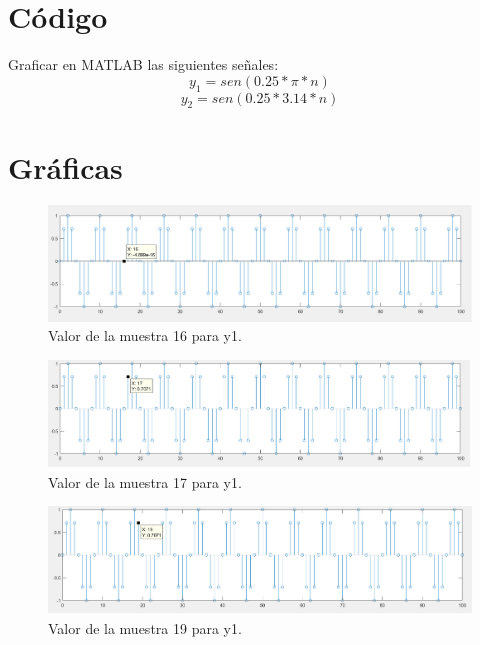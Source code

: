 \documentclass[12pt]{article}
\begin{document}

\newpage
\section{Código}
Graficar en MATLAB las siguientes señales:
$$y_{1}=sen(0.25*\pi*n)$$
$$y_{2}=sen(0.25*3.14*n)$$


\section{Gráficas}

\begin{figure}[h]
    \centering
        \includegraphics[width=15cm]{IMAGENES/T1_val1.png}
        \caption{Valor de la muestra 16 para y1.}
\end{figure}

\begin{figure}[h]
    \centering
        \includegraphics[width=15cm]{IMAGENES/T1_val2.png}
        \caption{Valor de la muestra 17 para y1.}
\end{figure}

\begin{figure}[h]
    \centering
        \includegraphics[width=15cm]{IMAGENES/T1_val3.png}
        \caption{Valor de la muestra 19 para y1.}
\end{figure}
\end{document}
